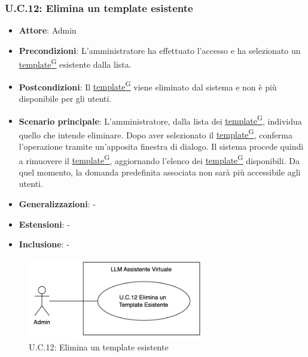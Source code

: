 \subsubsection{U.C.12: Elimina un template esistente}
\begin{itemize}
    \item \textbf{Attore}: Admin
    \item \textbf{Precondizioni}: L'amministratore ha effettuato l'accesso e ha selezionato un \href{https://code7crusaders.github.io/docs/RTB/documentazione_interna/glossario.html#template}{template\textsuperscript{G}} esistente dalla lista. 
    \item \textbf{Postcondizioni}: Il \href{https://code7crusaders.github.io/docs/RTB/documentazione_interna/glossario.html#template}{template\textsuperscript{G}} viene eliminato dal sistema e non è più disponibile per gli utenti.
    \item \textbf{Scenario principale}: L'amministratore, dalla lista dei \href{https://code7crusaders.github.io/docs/RTB/documentazione_interna/glossario.html#template}{template\textsuperscript{G}}, individua quello che intende eliminare. Dopo aver selezionato il \href{https://code7crusaders.github.io/docs/RTB/documentazione_interna/glossario.html#template}{template\textsuperscript{G}}, conferma l'operazione tramite un'apposita finestra di dialogo. Il sistema procede quindi a rimuovere il \href{https://code7crusaders.github.io/docs/RTB/documentazione_interna/glossario.html#template}{template\textsuperscript{G}}, aggiornando l'elenco dei \href{https://code7crusaders.github.io/docs/RTB/documentazione_interna/glossario.html#template}{template\textsuperscript{G}} disponibili. Da quel momento, la domanda predefinita associata non sarà più accessibile agli utenti.
    \item \textbf{Generalizzazioni}: -
    \item \textbf{Estensioni}: -
    \item \textbf{Inclusione}: -
\end{itemize}
\begin{figure}[H]
    \centering
    \includegraphics[width=0.7\textwidth]{img/UC12.png}
    \caption{U.C.12: Elimina un template esistente}
\end{figure}
\newpage

